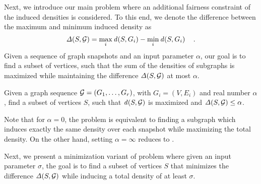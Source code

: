 Next, we introduce our main problem where an additional fairness constraint of the induced densities is considered. 
To this end, 
we denote the difference between the maximum and minimum induced density as
\[
    \diff{S, \calG} = \max_i \dens{S, G_i} - \min_i \dens{S, G_i} \quad.
\]
Given a sequence of graph snapshots and an input parameter $\alpha$, our goal
is to find a subset of vertices,
such that the sum of the densities of subgraphs is maximized while maintaining the difference $\diff{S, \calG}$ at most $\alpha$.


\begin{problem}
\label{pr:fair-dense-min}
Given a graph sequence ${\mathcal G} = (G_1,\dots,G_r)$, with  $G_i = (V, E_i)$ and  real number  $\alpha$, find a  subset of vertices
$S$, 
such that $\dens{S, \calG}$ is maximized
and $\diff{S, \calG} \leq  \alpha$.
\end{problem}

Note that for $\alpha = 0$, the \problemcdcsm problem is equivalent to finding a subgraph which induces exactly the same density over each snapshot while maximizing the total density.
On the other hand, setting $\alpha = \infty$ reduces \problemcdcsm to \problemdts.







Next, we present a minimization variant of \problemcdcsm problem where given an input parameter $\sigma$, the goal is to find a subset of vertices $S$ that minimizes the difference $\diff{S, \calG}$  while inducing a total density of at least $\sigma$. %


